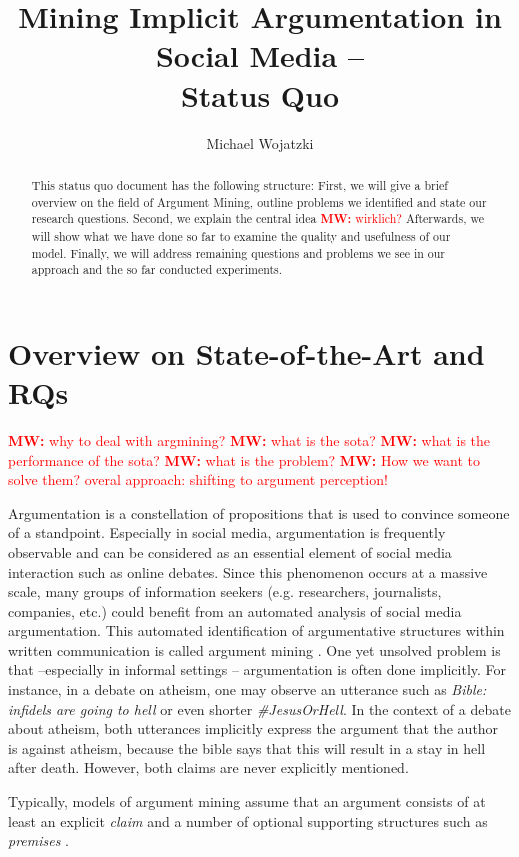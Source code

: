 \documentclass[11pt]{article}
\title{Mining Implicit Argumentation in Social Media --  \\ Status Quo}
\author{Michael Wojatzki}
\date{}
\newcommand{\mw}[1]{\textcolor{red}{\textbf{MW:} #1}}
\newcommand{\mw}[1]{}
\begin{document}
\maketitle
\begin{abstract}
This status quo document has the following structure:
First, we will give a brief overview on the field of Argument Mining, outline problems we identified and state our research questions.
Second, we explain the central idea \mw{wirklich?}
Afterwards, we will show what we have done so far to examine the quality and usefulness of our model.
Finally, we will address remaining questions and problems we see in our approach and the so far conducted experiments. 
\end{abstract}



\section{Overview on State-of-the-Art and RQs}
\mw{why to deal with argmining?}
\mw{what is the sota?}
\mw{what is the performance of the sota?}
\mw{what is the problem?}
\mw{How we want to solve them? overal approach: shifting to argument perception!}

Argumentation is a constellation of propositions that is used to convince someone of a standpoint.
Especially in social media, argumentation is frequently observable and can be considered as an essential element of social media interaction such as online debates.
Since this phenomenon occurs at a massive scale, many groups of information seekers (e.g. researchers, journalists, companies, etc.) could benefit from an automated analysis of social media argumentation.
This automated identification of argumentative structures within written
communication is called argument mining \cite{green2014argmining}.
One yet unsolved problem is that --especially in informal settings -- argumentation is often done implicitly.
For instance, in a debate on atheism, one may observe an utterance such as \textit{Bible: infidels are going to hell} or even shorter \textit{\#JesusOrHell}.
In the context of a debate about atheism, both utterances implicitly express the argument that the author is against atheism, because the bible says that this will result in a stay in hell after death.
However, both claims are never explicitly mentioned.

Typically, models of argument mining assume that an argument consists of at least an explicit \textit{claim} and a number of optional supporting structures such as \textit{premises} \cite{palau2009argumentation,peldszus2013ranking}.
\end{document}
